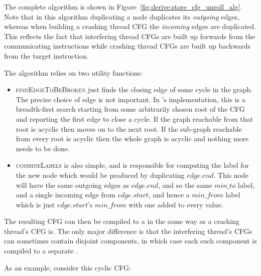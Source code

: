 The complete algorithm is shown in
Figure~\ref{fig:derive:store_cfg_unroll_alg}.  Note that in this
algorithm duplicating a node duplicates its \emph{outgoing} edges,
whereas when building a crashing thread CFG the \emph{incoming} edges
are duplicated.  This reflects the fact that interfering thread CFGs
are built up forwards from the communicating instructions while crashing
thread CFGs are built up backwards from the target instruction.

The algorithm relies on two utility functions:

\begin{itemize}
\item \textsc{findEdgeToBeBroken} just finds the closing edge of some
  cycle in the graph.  The precise choice of edge is not
  important.  In {\implementation}'s implementation, this is a
  breadth-first search starting from some arbitrarily chosen root of
  the CFG and reporting the first edge to close a cycle.  If the graph
  reachable from that root is acyclic then {\implementation} moves on
  to the next root.  If the sub-graph reachable from every root is
  acyclic then the whole graph is acyclic and nothing more needs to be
  done.
\item \textsc{combineLabels} is also simple, and is responsible for
  computing the label for the new node which would be produced by
  duplicating $\mathit{edge}.\mathit{end}$.  This node will have the
  same outgoing edges as $\mathit{edge}.\mathit{end}$, and so the same
  $min\_to$ label, and a single incoming edge from
  $\mathit{edge}.\mathit{start}$, and hence a $\mathit{min\_from}$
  label which is just $\mathit{edge}.\mathit{start}$'s
  $\mathit{min\_from}$ with one added to every value.
\end{itemize}

The resulting CFG can then be compiled to a {\StateMachine} in the
same way as a crashing thread's CFG is.  The only major difference is
that the interfering thread's CFGs can sometimes contain disjoint
components, in which case each such component is compiled to a
separate {\StateMachine}.

As an example, consider this cyclic CFG:

